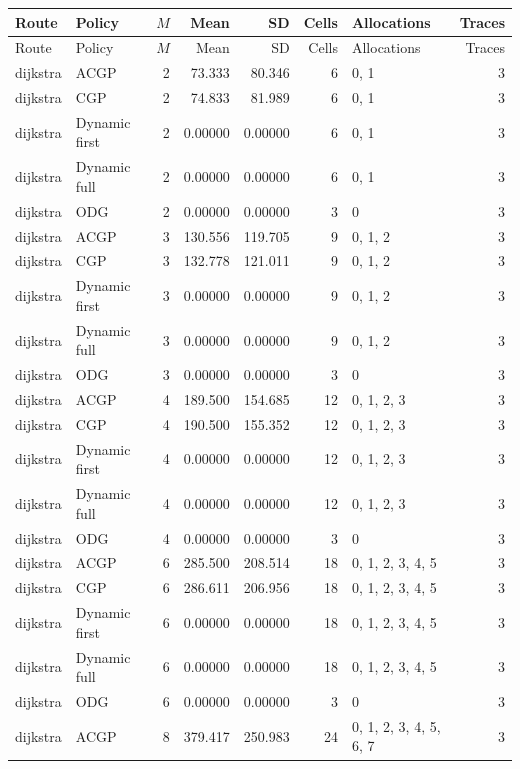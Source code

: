 \documentclass[10pt,a4paper]{article}
\begin{document}
\tiny\setlength{\tabcolsep}{2pt}\begin{longtable}{@{}p{23mm}p{29mm}rrrrp{36mm}r@{}}
\toprule Route & Policy & $M$ & Mean & SD & Cells & Allocations & Traces \\ \midrule\endfirsthead
\toprule Route & Policy & $M$ & Mean & SD & Cells & Allocations & Traces \\ \midrule\endhead
\bottomrule\endfoot
dijkstra & ACGP & 2 & 73.333 & 80.346 & 6 & 0, 1 & 3 \\
dijkstra & CGP & 2 & 74.833 & 81.989 & 6 & 0, 1 & 3 \\
dijkstra & Dynamic first & 2 & 0.00000 & 0.00000 & 6 & 0, 1 & 3 \\
dijkstra & Dynamic full & 2 & 0.00000 & 0.00000 & 6 & 0, 1 & 3 \\
dijkstra & ODG & 2 & 0.00000 & 0.00000 & 3 & 0 & 3 \\
dijkstra & ACGP & 3 & 130.556 & 119.705 & 9 & 0, 1, 2 & 3 \\
dijkstra & CGP & 3 & 132.778 & 121.011 & 9 & 0, 1, 2 & 3 \\
dijkstra & Dynamic first & 3 & 0.00000 & 0.00000 & 9 & 0, 1, 2 & 3 \\
dijkstra & Dynamic full & 3 & 0.00000 & 0.00000 & 9 & 0, 1, 2 & 3 \\
dijkstra & ODG & 3 & 0.00000 & 0.00000 & 3 & 0 & 3 \\
dijkstra & ACGP & 4 & 189.500 & 154.685 & 12 & 0, 1, 2, 3 & 3 \\
dijkstra & CGP & 4 & 190.500 & 155.352 & 12 & 0, 1, 2, 3 & 3 \\
dijkstra & Dynamic first & 4 & 0.00000 & 0.00000 & 12 & 0, 1, 2, 3 & 3 \\
dijkstra & Dynamic full & 4 & 0.00000 & 0.00000 & 12 & 0, 1, 2, 3 & 3 \\
dijkstra & ODG & 4 & 0.00000 & 0.00000 & 3 & 0 & 3 \\
dijkstra & ACGP & 6 & 285.500 & 208.514 & 18 & 0, 1, 2, 3, 4, 5 & 3 \\
dijkstra & CGP & 6 & 286.611 & 206.956 & 18 & 0, 1, 2, 3, 4, 5 & 3 \\
dijkstra & Dynamic first & 6 & 0.00000 & 0.00000 & 18 & 0, 1, 2, 3, 4, 5 & 3 \\
dijkstra & Dynamic full & 6 & 0.00000 & 0.00000 & 18 & 0, 1, 2, 3, 4, 5 & 3 \\
dijkstra & ODG & 6 & 0.00000 & 0.00000 & 3 & 0 & 3 \\
dijkstra & ACGP & 8 & 379.417 & 250.983 & 24 & 0, 1, 2, 3, 4, 5, 6, 7 & 3 \\

\end{longtable}
\end{document}
